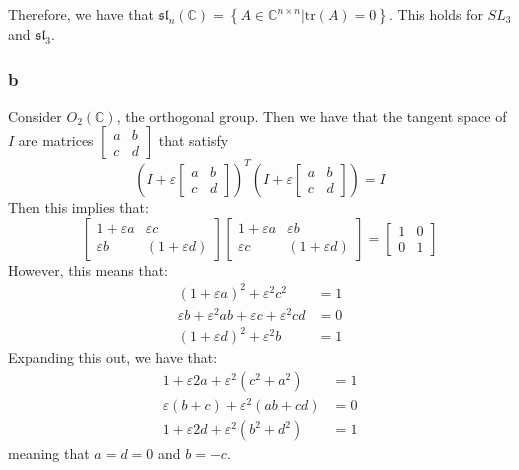 \documentclass[]{article}
\newcommand{\tr}{\text{tr}}
\begin{document}
Therefore, we have that $\mathfrak{sl}_n(\mathbb{C}) = \left\{A \in \mathbb{C}^{n \times n} | \tr(A) = 0\right\}$.
This holds for $SL_3$ and $\mathfrak{sl}_3$. 

\subsubsection*{b}
Consider $O_2(\mathbb{C})$, the orthogonal group. Then we have that the tangent space of $I$ are matrices $\begin{bmatrix}
	a & b \\
	c & d
\end{bmatrix}
$
that satisfy 
\begin{equation}
	\left(I + \varepsilon \begin{bmatrix}
		a & b \\
		c & d
	\end{bmatrix}\right)^T 
\left(I + \varepsilon \begin{bmatrix}
	a & b \\
	c & d
\end{bmatrix}\right)
 = I
\end{equation}
Then this implies that:
\begin{equation}
	\begin{bmatrix}
		1 + \varepsilon a & \varepsilon c\\
		\varepsilon b & (1 + \varepsilon d)
	\end{bmatrix}
	\begin{bmatrix}
	1 + \varepsilon a & \varepsilon b\\
	\varepsilon c & (1 + \varepsilon d)
\end{bmatrix}
= 
\begin{bmatrix}
	1 & 0\\
	0 & 1
\end{bmatrix}
\end{equation}
However, this means that:
\begin{align*}
	(1 + \varepsilon a)^2 + \varepsilon^2 c^2 &= 1\\
	\varepsilon b + \varepsilon^2 ab + \varepsilon c + \varepsilon^2 cd &= 0\\
	(1 + \varepsilon d)^2 + \varepsilon^2 b &= 1
\end{align*}
Expanding this out, we have that:
\begin{align*}
	1 + \varepsilon 2a + \varepsilon^2 (c^2 + a^2) &= 1\\
	\varepsilon (b + c) + \varepsilon^2 (ab + cd) &= 0\\
	1 + \varepsilon 2d + \varepsilon^2 (b^2 + d^2) &= 1
\end{align*}
meaning that $a = d = 0$ and $b = -c$. 
\end{document}
